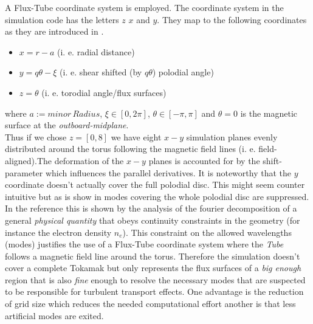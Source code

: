 \documentclass[master.tex]{subfiles}
\begin{document}
A Flux-Tube coordinate system is employed.
The coordinate system in the simulation code has the letters $z$ $x$ and $y$. They map to the following coordinates as they are introduced in \cite{doi:10.1063/1.1335832}.
\begin{itemize}
    \item $x = r - a$   (i. e. radial distance)
    \item $y = q\theta - \xi$ (i. e. shear shifted (by $q\theta$) polodial angle)
    \item $z = \theta$ (i. e. torodial angle/flux surfaces)
\end{itemize} 
where $a:=minor\, Radius$, $\xi \in [0,2\pi]$, $\theta \in [-\pi,\pi]$ and $\theta = 0$ is the magnetic surface at the \textit{outboard-midplane}.\\
Thus if we chose $z=[0,8]$ we have eight $x-y$ simulation planes evenly distributed around the torus following the magnetic field lines (i. e. field-aligned).The deformation of the $x-y$ planes is accounted for by the shift-parameter which influences the parallel derivatives.\newline
It is noteworthy that the $y$ coordinate doesn't actually cover the full polodial disc. This might seem counter intuitive but as is show in \cite{ScottFluxTube} modes covering the whole polodial disc are suppressed. In the reference this is shown by the analysis of the fourier decomposition of a general \textit{physical quantity} that obeys continuity constraints in the geometry (for instance the electron density $n_e$).
This constraint on the allowed wavelengths (modes) justifies the use of a Flux-Tube coordinate system where the \textit{Tube} follows a magnetic field line around the torus. Therefore the simulation doesn't cover a complete Tokamak but only represents the flux surfaces of a \textit{big enough} region that is also \textit{fine} enough to resolve the necessary modes that are suspected to be responsible for turbulent transport effects.\newline
One advantage is the reduction of grid size which reduces the needed computational effort another is that less artificial modes are exited.
\end{document}
